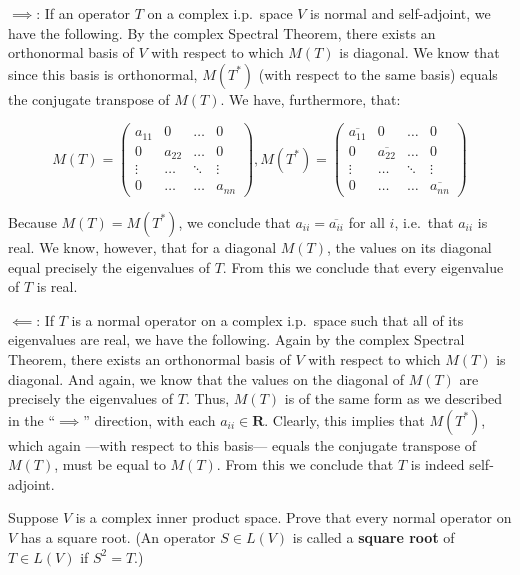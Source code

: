 \begin{solution}

    $\implies$: If an operator $T$ on a complex i.p.\ space $V$ is normal and self-adjoint, we have the following. By the complex Spectral Theorem, there exists an orthonormal basis of $V$ with respect to which $M(T)$ is diagonal. We know that since this basis is orthonormal, $M(T^*)$ (with respect to the same basis) equals the conjugate transpose of $M(T)$. We have, furthermore, that:

    $$M(T) = \begin{pmatrix} a_{11} & 0 & \ldots & 0 \\ 0 & a_{22} & \ldots & 0 \\ \vdots & \ldots & \ddots  & \vdots \\ 0 & \ldots & \ldots & a_{nn} \end{pmatrix}, M(T^*) = \begin{pmatrix} \overline{a_{11}} & 0 & \ldots & 0 \\ 0 & \overline{a_{22}} & \ldots & 0 \\ \vdots & \ldots & \ddots  & \vdots \\ 0 & \ldots & \ldots & \overline{a_{nn}} \end{pmatrix}$$

    Because $M(T) = M(T^*)$, we conclude that $a_{ii} = \overline{a_{ii}}$ for all $i$, i.e.\ that $a_{ii}$ is real. We know, however, that for a diagonal $M(T)$, the values on its diagonal equal precisely the eigenvalues of $T$. From this we conclude that every eigenvalue of $T$ is real.

    $\impliedby$: If $T$ is a normal operator on a complex i.p.\ space such that all of its eigenvalues are real, we have the following. Again by the complex Spectral Theorem, there exists an orthonormal basis of $V$ with respect to which $M(T)$ is diagonal. And again, we know that the values on the diagonal of $M(T)$ are precisely the eigenvalues of $T$. Thus, $M(T)$ is of the same form as we described in the ``$\implies$'' direction, with each $a_{ii} \in \mathbf{R}$. Clearly, this implies that $M(T^*)$, which again ---with respect to this basis--- equals the conjugate transpose of $M(T)$, must be equal to $M(T)$. From this we conclude that $T$ is indeed self-adjoint.
\end{solution}

\begin{exercise}{9}
    Suppose $V$ is a complex inner product space. Prove that every normal operator on $V$ has a square root. (An operator $S \in L(V)$ is called a \textbf{square root} of $T \in L(V)$ if $S^2 = T$.)
\end{exercise}


